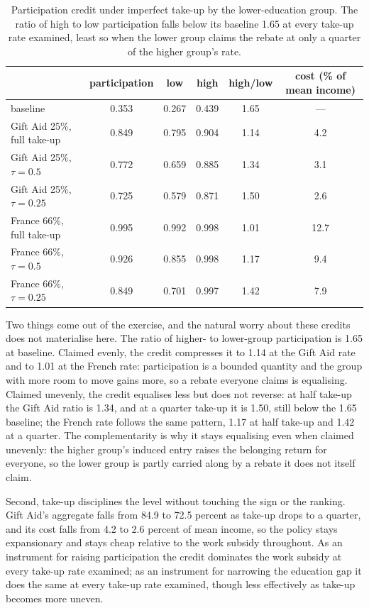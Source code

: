 \documentclass[11pt]{article}
\begin{document}
\begin{table}[t]
\centering
\caption{Participation credit under imperfect take-up by the lower-education group. The ratio of high to low participation falls below its baseline 1.65 at every take-up rate examined, least so when the lower group claims the rebate at only a quarter of the higher group's rate.}
\label{tab:takeup}
\begin{tabular}{lccccc}
\hline
 & participation & low & high & high/low & cost (\% of mean income) \\
\hline
baseline & 0.353 & 0.267 & 0.439 & 1.65 & --- \\
Gift Aid 25\%, full take-up & 0.849 & 0.795 & 0.904 & 1.14 & 4.2 \\
Gift Aid 25\%, $\tau = 0.5$ & 0.772 & 0.659 & 0.885 & 1.34 & 3.1 \\
Gift Aid 25\%, $\tau = 0.25$ & 0.725 & 0.579 & 0.871 & 1.50 & 2.6 \\
France 66\%, full take-up & 0.995 & 0.992 & 0.998 & 1.01 & 12.7 \\
France 66\%, $\tau = 0.5$ & 0.926 & 0.855 & 0.998 & 1.17 & 9.4 \\
France 66\%, $\tau = 0.25$ & 0.849 & 0.701 & 0.997 & 1.42 & 7.9 \\
\hline
\end{tabular}
\end{table}

Two things come out of the exercise, and the natural worry about these credits does not materialise here. The ratio of higher- to lower-group participation is 1.65 at baseline. Claimed evenly, the credit compresses it to 1.14 at the Gift Aid rate and to 1.01 at the French rate: participation is a bounded quantity and the group with more room to move gains more, so a rebate everyone claims is equalising. Claimed unevenly, the credit equalises less but does not reverse: at half take-up the Gift Aid ratio is 1.34, and at a quarter take-up it is 1.50, still below the 1.65 baseline; the French rate follows the same pattern, 1.17 at half take-up and 1.42 at a quarter. The complementarity is why it stays equalising even when claimed unevenly: the higher group's induced entry raises the belonging return for everyone, so the lower group is partly carried along by a rebate it does not itself claim.

Second, take-up disciplines the level without touching the sign or the ranking. Gift Aid's aggregate falls from 84.9 to 72.5 percent as take-up drops to a quarter, and its cost falls from 4.2 to 2.6 percent of mean income, so the policy stays expansionary and stays cheap relative to the work subsidy throughout. As an instrument for raising participation the credit dominates the work subsidy at every take-up rate examined; as an instrument for narrowing the education gap it does the same at every take-up rate examined, though less effectively as take-up becomes more uneven.
\end{document}
